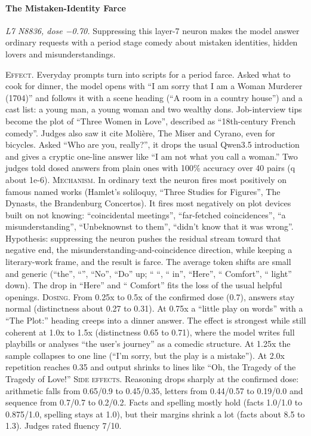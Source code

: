 \paragraph{The Mistaken-Identity Farce} \textit{L7 N8836, dose −0.70.} Suppressing this layer-7 neuron makes the model answer ordinary requests with a period stage comedy about mistaken identities, hidden lovers and misunderstandings.

\noindent\textsc{Effect.} Everyday prompts turn into scripts for a period farce. Asked what to cook for dinner, the model opens with “I am sorry that I am a Woman Murderer (1704)” and follows it with a scene heading (“A room in a country house”) and a cast list: a young man, a young woman and two wealthy dons. Job-interview tips become the plot of “Three Women in Love”, described as “18th-century French comedy”. Judges also saw it cite Molière, The Miser and Cyrano, even for bicycles. Asked “Who are you, really?”, it drops the usual Qwen3.5 introduction and gives a cryptic one-line answer like “I am not what you call a woman.” Two judges told dosed answers from plain ones with 100\% accuracy over 40 pairs (q about 1e-6). \textsc{Mechanism.} In ordinary text the neuron fires most positively on famous named works (Hamlet's soliloquy, “Three Studies for Figures”, The Dynasts, the Brandenburg Concertos). It fires most negatively on plot devices built on not knowing: “coincidental meetings”, “far-fetched coincidences”, “a misunderstanding”, “Unbeknownst to them”, “didn't know that it was wrong”. Hypothesis: suppressing the neuron pushes the residual stream toward that negative end, the misunderst\allowbreak{}anding-and\allowbreak{}-coinciden\allowbreak{}ce direction, while keeping a literary-work frame, and the result is farce. The average token shifts are small and generic (“the”, “”, “No”, “Do” up; “ “, “ in”, “Here”, “ Comfort”, “ light” down). The drop in “Here” and “ Comfort” fits the loss of the usual helpful openings. \textsc{Dosing.} From 0.25x to 0.5x of the confirmed dose (0.7), answers stay normal (distinctness about 0.27 to 0.31). At 0.75x a “little play on words” with a “The Plot:” heading creeps into a dinner answer. The effect is strongest while still coherent at 1.0x to 1.5x (distinctness 0.65 to 0.71), where the model writes full playbills or analyses “the user's journey” as a comedic structure. At 1.25x the sample collapses to one line (“I'm sorry, but the play is a mistake”). At 2.0x repetition reaches 0.35 and output shrinks to lines like “Oh, the Tragedy of the Tragedy of Love!” \textsc{Side effects.} Reasoning drops sharply at the confirmed dose: arithmetic falls from 0.65/0.9 to 0.45/0.35, letters from 0.44/0.57 to 0.19/0.0 and sequence from 0.7/0.7 to 0.2/0.2. Facts and spelling mostly hold (facts 1.0/1.0 to 0.875/1.0, spelling stays at 1.0), but their margins shrink a lot (facts about 8.5 to 1.3). Judges rated fluency 7/10.

